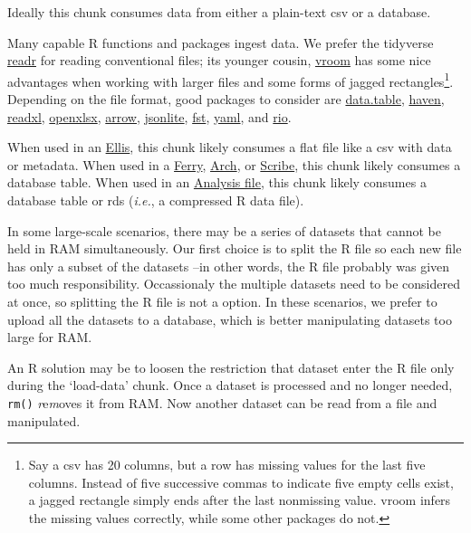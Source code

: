 \documentclass[
]{book}
\begin{document}
Ideally this chunk consumes data from either a plain-text csv or a database.

Many capable R functions and packages ingest data. We prefer the tidyverse \href{https://readr.tidyverse.org/}{readr} for reading conventional files; its younger cousin, \href{https://vroom.r-lib.org/}{vroom} has some nice advantages when working with larger files and some forms of jagged rectangles\footnote{Say a csv has 20 columns, but a row has missing values for the last five columns. Instead of five successive commas to indicate five empty cells exist, a jagged rectangle simply ends after the last nonmissing value. vroom infers the missing values correctly, while some other packages do not.}. Depending on the file format, good packages to consider are \href{https://cran.r-project.org/package=data.table}{data.table}, \href{https://haven.tidyverse.org/}{haven}, \href{https://readxl.tidyverse.org/}{readxl}, \href{https://ycphs.github.io/openxlsx/}{openxlsx}, \href{https://CRAN.R-project.org/package=arrow}{arrow}, \href{https://CRAN.R-project.org/package=jsonlite}{jsonlite}, \href{http://www.fstpackage.org/}{fst}, \href{https://CRAN.R-project.org/package=yaml}{yaml}, and \href{https://cloud.r-project.org/web/packages/rio/vignettes/rio.html}{rio}.

When used in an \protect\hyperlink{pattern-ellis}{Ellis}, this chunk likely consumes a flat file like a csv with data or metadata. When used in a \protect\hyperlink{pattern-ferry}{Ferry}, \protect\hyperlink{pattern-arch}{Arch}, or \protect\hyperlink{pattern-scribe}{Scribe}, this chunk likely consumes a database table. When used in an \protect\hyperlink{pattern-analysis}{Analysis file}, this chunk likely consumes a database table or rds (\emph{i.e.}, a compressed R data file).

In some large-scale scenarios, there may be a series of datasets that cannot be held in RAM simultaneously. Our first choice is to split the R file so each new file has only a subset of the datasets --in other words, the R file probably was given too much responsibility. Occassionaly the multiple datasets need to be considered at once, so splitting the R file is not a option. In these scenarios, we prefer to upload all the datasets to a database, which is better manipulating datasets too large for RAM.

An R solution may be to loosen the restriction that dataset enter the R file only during the `load-data' chunk. Once a dataset is processed and no longer needed, \texttt{rm()} \emph{r}e\emph{m}oves it from RAM. Now another dataset can be read from a file and manipulated.
\end{document}
